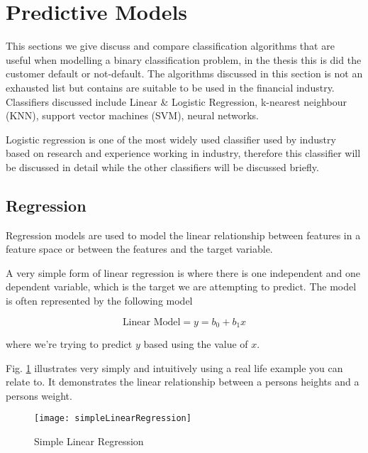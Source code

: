 \section{Predictive Models}
This sections we give discuss and compare classification algorithms that are useful when modelling a binary classification problem, in the thesis this is did the customer default or not-default. The algorithms discussed in this section is not an exhausted list but contains are suitable to be used in the financial industry. Classifiers discussed include Linear \& Logistic Regression, k-nearest neighbour (KNN), support vector machines (SVM), neural networks. 

Logistic regression is one of the most widely used classifier used by industry based on research and experience working in industry, therefore this classifier will be discussed in detail while the other classifiers will be discussed briefly.

\subsection{Regression} \label{Reg}
Regression models are used to model the linear relationship between features in a feature space or between the features and the target variable. 

A very simple form of linear regression is where there is one independent and one dependent variable, which is the target we are attempting to predict. The model is often represented by the following model

\begin{equation} \label{eq:reg}
	\text{Linear Model} = y = b_0 + b_1x
\end{equation}

where we're trying to predict $y$ based using the value of $x$.

Fig. \ref{fig:simpleLinearRegression} illustrates very simply and intuitively using a real life example you can relate to. It demonstrates the linear relationship between a persons heights and a persons weight.

\begin{figure}[H]
	\texttt{[image: simpleLinearRegression]}
	\caption[Confusion Matrix]
	{Simple Linear Regression}
	\label{fig:simpleLinearRegression}
\end{figure}

